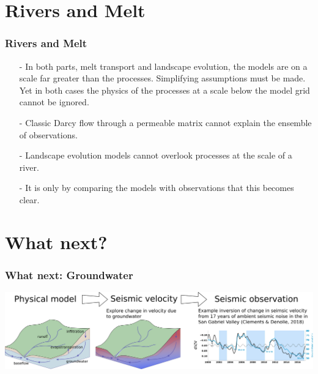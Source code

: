 \documentclass[aspectratio=169]{beamer}
\begin{document}
\section{Rivers and Melt}

\begin{frame}
    \frametitle{Rivers and Melt}
    \begin{itemize}
        \item[-]{In both parts, melt transport and landscape evolution, the models are on a scale far greater than the processes.
                 Simplifying assumptions must be made. Yet in both cases the physics of the processes at a scale below the model grid cannot be ignored.}
        \item[-]{Classic Darcy flow through a permeable matrix cannot explain the ensemble of observations.}
        \item[-]{Landscape evolution models cannot overlook processes at the scale of a river.}
        \item[-]{It is only by comparing the models with observations that this becomes clear.}
    \end{itemize}
\end{frame}

\section{What next?}

\begin{frame}
    \frametitle{What next: Groundwater}
    \includegraphics[width=0.9\paperwidth]{./figures/groundwater.svg.png}
\end{frame}
\end{document}
